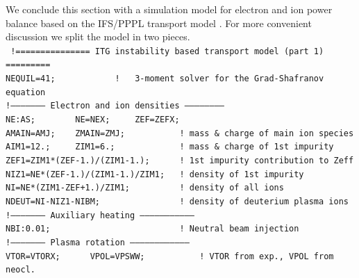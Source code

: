 We conclude this section with a simulation model for electron and ion 
power balance based on the IFS/PPPL transport model \cite{ifspppl}.
For more convenient discussion we split the model in two pieces.
\\
{\tt\hspace*{1mm}
!=============== ITG instability based transport model (part 1) =========
\\ \hspace*{1mm}
NEQUIL=41;~~~~~~~~~~~~!~~~3-moment solver for the Grad-Shafranov equation
\\ \hspace*{1mm}
!-------------------- Electron and ion densities ------------------------
\\ \hspace*{1mm}
NE:AS;~~~~~~~~NE=NEX;~~~~~ZEF=ZEFX;
\\ \hspace*{1mm}
AMAIN=AMJ;~~~~ZMAIN=ZMJ;~~~~~~~~~~~!~mass \& charge of main ion species
\\ \hspace*{1mm}
AIM1=12.;~~~~~ZIM1=6.;~~~~~~~~~~~~~!~mass \& charge of 1st impurity
\\ \hspace*{1mm}
ZEF1=ZIM1*(ZEF-1.)/(ZIM1-1.);~~~~~~!~1st impurity contribution to Zeff
\\ \hspace*{1mm}
NIZ1=NE*(ZEF-1.)/(ZIM1-1.)/ZIM1;~~~!~density of 1st impurity
\\ \hspace*{1mm}
NI=NE*(ZIM1-ZEF+1.)/ZIM1;~~~~~~~~~~!~density of all ions
\\ \hspace*{1mm}
NDEUT=NI-NIZ1-NIBM;~~~~~~~~~~~~~~~~!~density of deuterium plasma ions
\\ \hspace*{1mm}
!-------------------- Auxiliary heating ---------------------------------
\\ \hspace*{1mm}
NBI:0.01;~~~~~~~~~~~~~~~~~~~~~~~~~~!~Neutral beam injection
\\ \hspace*{1mm}
!-------------------- Plasma rotation -----------------------------------
\\ \hspace*{1mm}
VTOR=VTORX;~~~~~~VPOL=VPSWW;~~~~~~~~~~~!~VTOR from exp., VPOL from neocl.
\\ \hspace*{1mm}
}
